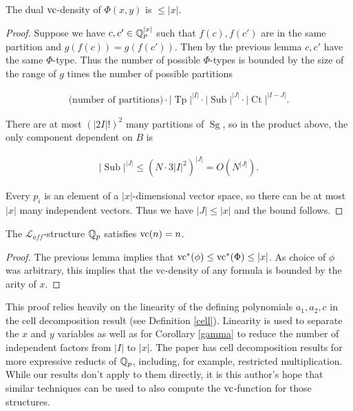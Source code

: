 \documentclass{amsart}
\renewcommand{\LL}{\mathcal L}
\newcommand{\paren}[1]{\left(#1\right)}
\DeclareMathOperator{\Sg}{Sg}
\DeclareMathOperator{\It}{Tp}
\DeclareMathOperator{\Sub}{Sub}
\DeclareMathOperator{\Ct}{Ct}
\begin{document}
\begin{Corollary}
  The dual $\operatorname{vc}$-density of $\Phi(x,y)$ is $\leq |x|$.
\end{Corollary}

\begin{proof}
  Suppose we have $c, c' \in \mathbb{Q}_p^{|x|}$ such that $f(c), f(c')$ are in the same partition and $g(f(c)) = g(f(c'))$.
  Then by the previous lemma $c, c'$ have the same $\Phi$-type.
  Thus the number of possible $\Phi$-types is bounded by the size of the range of $g$ times the number of possible partitions
  
  \begin{align*}
    \text{(number of partitions)} \cdot |\It|^{|I|} \cdot |\Sub|^{|J|} \cdot |\Ct|^{|I-J|}.
  \end{align*}

  There are at most $\paren{|2I|!}^2$ many partitions of $\Sg$,
  so in the product above, the only component dependent on $B$ is

  \begin{align*}
    |\Sub|^{|J|} \leq (N \cdot 3{|I|}^2)^{|J|} = O(N^{|J|}).
  \end{align*}	
  
  Every $p_i$ is an element of a $|x|$-dimensional vector space, so there can be at most $|x|$ many independent vectors.
  Thus we have $|J| \leq |x|$ and the bound follows.
\end{proof}

\begin{Corollary} 
  The $\LL_{aff}$-structure $\mathbb{Q}_p$ satisfies $\operatorname{vc}(n) = n$.
\end{Corollary}

\begin{proof}
  The previous lemma implies that $\operatorname{vc}^*(\phi) \leq \operatorname{vc}^*(\Phi) \leq |x|$.
  As choice of $\phi$ was arbitrary, this implies that the vc-density of any formula is bounded by the arity of $x$.
\end{proof}

This proof relies heavily on the linearity of the defining polynomials $a_1, a_2, c$ in the cell decomposition result (see Definition \ref{cell}).
Linearity is used to separate the $x$ and $y$ variables as well as
for Corollary \ref{gamma} to reduce the number of independent factors from $|I|$ to $|x|$.
The paper \cite{reduct} has cell decomposition results for more expressive reducts of $\mathbb{Q}_p$,
including, for example, restricted multiplication.
While our results don't apply to them directly,
it is this author's hope that similar techniques can be used to also compute the $\operatorname{vc}$-function for those structures.
\end{document}
